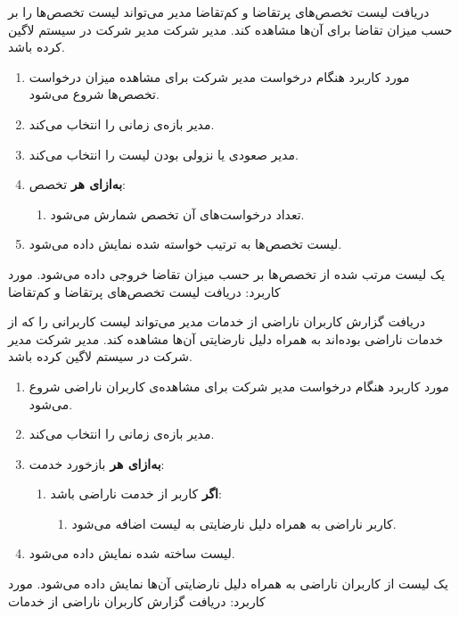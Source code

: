 {
\usecase
{دریافت لیست تخصص‌های پرتقاضا و کم‌تقاضا}
{}
{مدیر می‌تواند لیست تخصص‌ها را بر حسب میزان تقاضا برای آن‌ها مشاهده کند.}
{مدیر شرکت}
{}
{مدیر شرکت در سیستم لاگین کرده باشد.}
{
	\vspace*{-0.6cm}
	\begin{enumerate}
		\item 
		مورد کاربرد هنگام درخواست مدیر شرکت برای مشاهده میزان درخواست تخصص‌ها شروع می‌شود.
		\item
		مدیر بازه‌ی زمانی را انتخاب می‌کند.
		\item
		مدیر صعودی یا نزولی بودن لیست را انتخاب می‌کند.
		\item
		\textbf{به‌ازای هر} تخصص:
		\begin{enumerate}[label=\theenumi.\arabic*.]
			\item تعداد درخواست‌های آن تخصص شمارش می‌شود.
		\end{enumerate}
		\item
		لیست تخصص‌ها به ترتیب خواسته شده نمایش داده می‌شود.
	\end{enumerate}
}
{یک لیست مرتب شده از تخصص‌ها بر حسب میزان تقاضا خروجی داده می‌شود.}
{
}
{
	مورد کاربرد: دریافت لیست تخصص‌های پرتقاضا و کم‌تقاضا
}
}


{
\usecase
{دریافت گزارش کاربران ناراضی از خدمات}
{}
{مدیر می‌تواند لیست کاربرانی را که از خدمات ناراضی بوده‌اند به همراه دلیل نارضایتی آن‌ها مشاهده کند.}
{مدیر شرکت}
{}
{مدیر شرکت در سیستم لاگین کرده باشد.}
{
	\vspace*{-0.6cm}
	\begin{enumerate}
		\item 
		مورد کاربرد هنگام درخواست مدیر شرکت برای مشاهده‌ی کاربران ناراضی شروع می‌شود.
		\item
		مدیر بازه‌ی زمانی را انتخاب می‌کند.
		\item
		\textbf{به‌ازای هر} بازخورد خدمت:
		\begin{enumerate}[label=\theenumi.\arabic*.]
			\item 
			\textbf{اگر} کاربر از خدمت ناراضی باشد:
			\begin{enumerate}
				\item 
				کاربر ناراضی به همراه دلیل نارضایتی به لیست اضافه می‌شود.
			\end{enumerate}
		\end{enumerate}
		\item
		لیست ساخته شده نمایش داده می‌شود.
	\end{enumerate}
}
{یک لیست از کاربران ناراضی به همراه دلیل نارضایتی آن‌ها نمایش داده می‌شود.}
{
}
{
مورد کاربرد: دریافت گزارش کاربران ناراضی از خدمات
}
}

